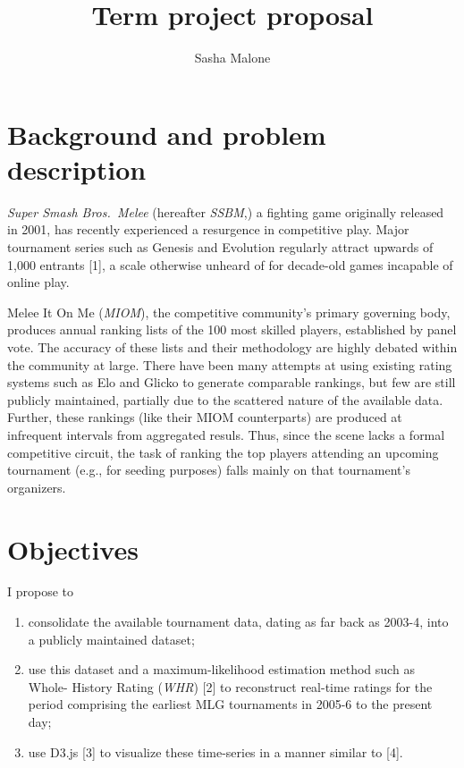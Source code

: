 \documentclass[10pt]{article}
\title{Term project proposal}
\author{Sasha Malone}
\theoremstyle{definition}
\theoremstyle{remark}
\providecommand{\tightlist}{%
      \setlength{\itemsep}{0pt}\setlength{\parskip}{0pt}}
\begin{document}
\hypertarget{background-and-problem-description}{%
\section{Background and problem
description}\label{background-and-problem-description}}

\emph{Super Smash Bros.~Melee} (hereafter \emph{SSBM},) a fighting game
originally released in 2001, has recently experienced a resurgence in
competitive play. Major tournament series such as Genesis and Evolution
regularly attract upwards of 1,000 entrants {[}1{]}, a scale otherwise
unheard of for decade-old games incapable of online play.

Melee It On Me (\emph{MIOM}), the competitive community's primary
governing body, produces annual ranking lists of the 100 most skilled
players, established by panel vote. The accuracy of these lists and
their methodology are highly debated within the community at large.
There have been many attempts at using existing rating systems such as
Elo and Glicko to generate comparable rankings, but few are still
publicly maintained, partially due to the scattered nature of the
available data. Further, these rankings (like their MIOM counterparts)
are produced at infrequent intervals from aggregated resuls. Thus, since
the scene lacks a formal competitive circuit, the task of ranking the
top players attending an upcoming tournament (e.g., for seeding
purposes) falls mainly on that tournament's organizers.

\hypertarget{objectives}{%
\section{Objectives}\label{objectives}}

I propose to

\begin{enumerate}
\def\labelenumi{\roman{enumi}.}
\tightlist
\item
  consolidate the available tournament data, dating as far back as
  2003-4, into a publicly maintained dataset;
\item
  use this dataset and a maximum-likelihood estimation method such as
  Whole- History Rating (\emph{WHR}) {[}2{]} to reconstruct real-time
  ratings for the period comprising the earliest MLG tournaments in
  2005-6 to the present day;
\item
  use D3.js {[}3{]} to visualize these time-series in a manner similar
  to {[}4{]}.
\end{enumerate}
\end{document}
